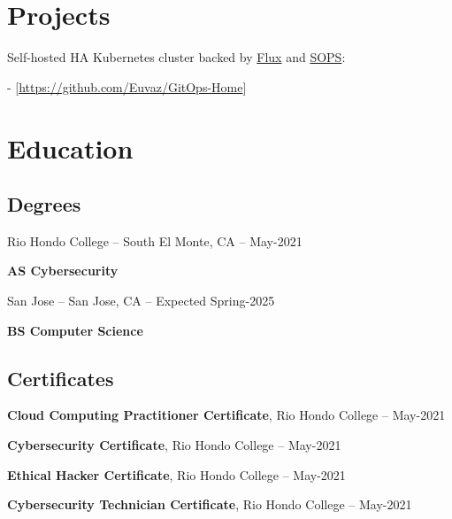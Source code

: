 \documentclass[a4paper]{article}
\begin{document}
\section{Projects}
Self-hosted HA Kubernetes cluster backed by \href{https://toolkit.fluxcd.io}{Flux} and \href{https://toolkit.fluxcd.io/guides/mozilla-sops}{SOPS}:\par
- [\url{https://github.com/Euvaz/GitOps-Home}]

\section{Education}
\subsection{Degrees}
Rio Hondo College -- South El Monte, CA -- May-2021\par
\textbf{AS Cybersecurity}\par

\medskip
San Jose -- San Jose, CA -- Expected Spring-2025\par
\textbf{BS Computer Science}

\subsection{Certificates}
\textbf{Cloud Computing Practitioner Certificate}, Rio Hondo College -- May-2021\par
\textbf{Cybersecurity Certificate}, Rio Hondo College -- May-2021\par
\textbf{Ethical Hacker Certificate}, Rio Hondo College -- May-2021\par
\textbf{Cybersecurity Technician Certificate}, Rio Hondo College -- May-2021
\end{document}
